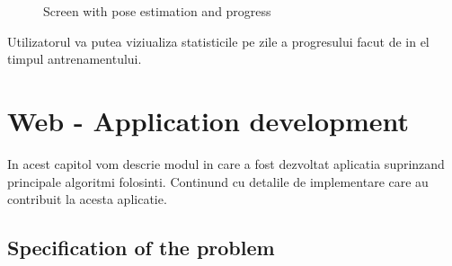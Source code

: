 \begin{figure}[!htb]
  \centering
  \hfill
    
    \caption{Screen with pose estimation and progress}
\end{figure}
Utilizatorul va putea viziualiza statisticile pe zile a progresului facut de in el timpul antrenamentului. 

\section{Web - Application development}

In acest capitol vom descrie modul in care a fost dezvoltat aplicatia suprinzand principale algoritmi folosinti. 
Continund cu detalile de implementare care au contribuit la acesta aplicatie.



\subsection{Specification of the problem}

